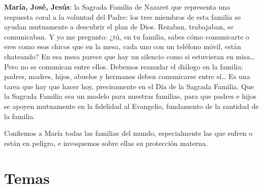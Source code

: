 \begin{body}
					\textbf{María, José, Jesús}: la Sagrada Familia de Nazaret que representa una respuesta coral a la voluntad del Padre: los tres miembros de esta familia se ayudan mutuamente a descubrir el plan de Dios. Rezaban, trabajaban, se comunicaban. Y yo me pregunto: ¿tú, en tu familia, sabes cómo comunicarte o eres como esos chicos que en la mesa, cada uno con un teléfono móvil, están chateando? En esa mesa parece que hay un silencio como si estuvieran en misa\ldots{} Pero no se comunican entre ellos. Debemos reanudar el diálogo en la familia: padres, madres, hijos, abuelos y hermanos deben comunicarse entre sí\ldots{} Es una tarea que hay que hacer hoy, precisamente en el Día de la Sagrada Familia. Que la Sagrada Familia sea un modelo para nuestras familias, para que padres e hijos se apoyen mutuamente en la fidelidad al Evangelio, fundamento de la santidad de la familia.
					
					Confiemos a María  todas las familias del mundo, especialmente las que sufren o están en peligro, e invoquemos sobre ellas su protección materna.
				\end{body}

\newsection

	\section{Temas}
	
		